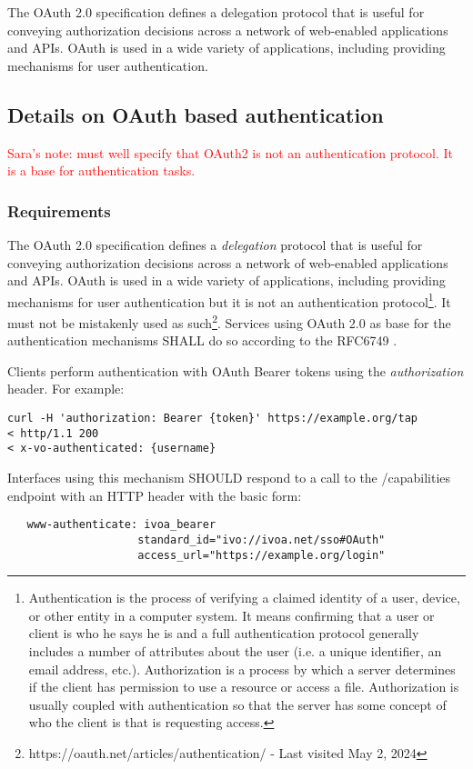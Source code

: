 \documentclass[11pt,a4paper]{ivoa}
\begin{document}
The OAuth 2.0 specification defines a delegation protocol that is
useful for conveying authorization decisions across a network of
web-enabled applications and APIs. OAuth is used in a wide variety
of applications, including providing mechanisms for user authentication.

\subsection{Details on OAuth based authentication}
\textcolor{red}{Sara's note: must well specify that OAuth2 is not an 
authentication protocol. It is a base for authentication tasks.}
\subsubsection{Requirements}
The OAuth 2.0 specification defines a \emph{delegation}
protocol that is useful for conveying authorization decisions across a 
network of web-enabled applications and APIs. OAuth is used in a wide 
variety of applications, including providing mechanisms for user 
authentication but it is not an authentication protocol\footnote{
Authentication is the process of verifying a claimed identity of a 
user, device, or other entity in a computer system.  It means 
confirming that a user or client is who he says he is and a full 
authentication protocol generally includes a number of attributes 
about the user (i.e. a unique identifier, an email address, etc.). 
Authorization is a process by which a server determines if the client 
has permission to use a resource or access a file. Authorization is 
usually coupled with authentication so that the server has some concept 
of who the client is that is requesting access.}. It must not be 
mistakenly used as 
such\footnote{https://oauth.net/articles/authentication/ - Last visited
May 2, 2024}.
Services using OAuth 2.0 as base for the authentication mechanisms SHALL
do so according to the RFC6749 \citep{std:RFC6749}.

Clients perform authentication with OAuth Bearer tokens using the
\emph{authorization} header. For example:

\begin{verbatim}
curl -H 'authorization: Bearer {token}' https://example.org/tap
< http/1.1 200
< x-vo-authenticated: {username}
\end{verbatim}

Interfaces using this mechanism SHOULD respond to a call to the 
/capabilities endpoint with an HTTP header with the basic form:
\begin{verbatim}
   www-authenticate: ivoa_bearer 
                    standard_id="ivo://ivoa.net/sso#OAuth"
                    access_url="https://example.org/login"
\end{verbatim}
\end{document}

